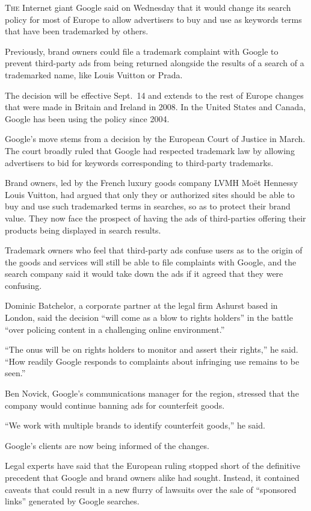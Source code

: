 ﻿\documentclass[12pt]{article}
\begin{document}
\lettrine{T}{he} Internet giant Google said on Wednesday that it would
change its search policy for most of Europe to allow advertisers to buy and use as keywords terms
that have been trademarked by others.

Previously, brand owners could file a trademark complaint with Google to prevent third-party ads
from being returned alongside the results of a search of a trademarked name, like Louis Vuitton or
Prada.

The decision will be effective Sept.~14 and extends to the rest of Europe changes that were made in
Britain and Ireland in 2008. In the United States and Canada, Google has been using the policy since
2004.

Google's move stems from a decision by the European Court of Justice in March. The court broadly
ruled that Google had respected trademark law by allowing advertisers to bid for keywords
corresponding to third-party trademarks.

Brand owners, led by the French luxury goods company LVMH Mo\"et Hennessy Louis Vuitton, had argued
that only they or authorized sites should be able to buy and use such trademarked terms in searches,
so as to protect their brand value. They now face the prospect of having the ads of third-parties
offering their products being displayed in search results.

Trademark owners who feel that third-party ads confuse users as to the origin of the goods and
services will still be able to file complaints with Google, and the search company said it would
take down the ads if it agreed that they were confusing.

Dominic Batchelor, a corporate partner at the legal firm Ashurst based in London, said the decision
``will come as a blow to rights holders'' in the battle ``over policing content in a challenging
online environment.''

``The onus will be on rights holders to monitor and assert their rights,'' he said. ``How readily
Google responds to complaints about infringing use remains to be seen.''

Ben Novick, Google's communications manager for the region, stressed that the company would continue
banning ads for counterfeit goods.

``We work with multiple brands to identify counterfeit goods,'' he said.

Google's clients are now being informed of the changes.

Legal experts have said that the European ruling stopped short of the definitive precedent that
Google and brand owners alike had sought. Instead, it contained caveats that could result in a new
flurry of lawsuits over the sale of ``sponsored links'' generated by Google searches.
\end{document}
